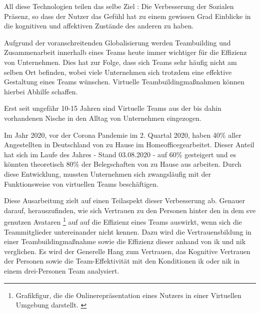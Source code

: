 \documentclass[a4paper,11pt]{article}%
\renewcommand{\\}{\vspace*{0.5\baselineskip} \newline}
\begin{document}
All diese Technologien teilen das selbe Ziel : \\ \flqq Die Verbesserung der Sozialen Präsenz, so dass der Nutzer das Gefühl hat zu einem gewissen Grad Einblicke in die kognitiven und affektiven Zustände des anderen zu haben.\frqq \citep{biocca2002defining} \citep[p.407–447]{biocca2001plugging} \\

	Aufgrund der voranschreitenden Globalisierung werden Teambuilding und Zusammenarbeit innerhalb eines Teams heute immer wichtiger für die Effizienz von Unternehmen. Dies hat zur Folge, dass sich Teams sehr häufig nicht am selben Ort befinden, wobei viele Unternehmen sich trotzdem eine effektive Gestaltung eines Teams wünschen.\citep[p.791-792]{jarvenpaa1999communication} Virtuelle Teambuildingmaßnahmen können hierbei Abhilfe schaffen. 
	
Erst seit ungefähr 10-15 Jahren sind Virtuelle Teams aus der bis dahin vorhandenen Nische in den Alltag von Unternehmen eingezogen. \citep{gilson2015virtual}

Im Jahr 2020, vor der Corona Pandemie im 2. Quartal 2020, haben 40\% aller Angestellten in Deutschland von zu Hause im \flqq Homeoffice\frqq gearbeitet. Dieser Anteil hat sich im Laufe des Jahres - Stand 03.08.2020 - auf 60\% gesteigert und es könnten theoretisch 80\% der Belegschaften von zu Hause aus arbeiten. \citep{statistaCorona2020} Durch diese Entwicklung, mussten Unternehmen sich zwangsläufig mit der Funktionsweise von virtuellen Teams beschäftigen.
	
Diese Ausarbeitung zielt auf einen Teilaspekt dieser Verbesserung ab. Genauer darauf, herauszufinden, wie sich Vertrauen zu den Personen hinter den in dem \ac{sve} genutzen Avataren \footnote{Grafikfigur, die die Onlinerepräsentation eines Nutzers in einer Virtuellen Umgebung darstellt. \citep[p.1]{neustaedter2009presenting}} auf auf die Effizienz eines Teams auswirkt, wenn sich die Teammitglieder untereinander nicht kennen. Dazu wird die Vertrauensbildung in einer Teambuildingmaßnahme sowie die Effizienz dieser anhand von \ac{ik} und \ac{nik} verglichen.	
Es wird der Generelle Hang zum Vertrauen, das Kognitive Vertrauen der Personen sowie die Team-Effektivität mit den Konditionen \ac{ik} oder \ac{nik} in einem drei-Personen Team analysiert. 


\newpage
\end{document}
